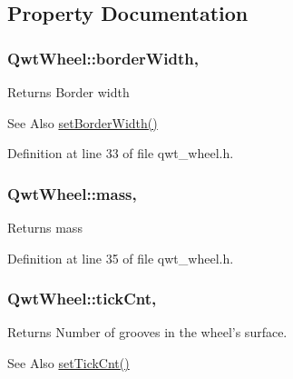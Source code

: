 \subsection{Property Documentation}
\hypertarget{class_qwt_wheel_acc48deaf20aee5957e81bd718bfbc207}{
\subsubsection[{border\-Width}]{ Qwt\-Wheel\-::border\-Width\hspace{0.3cm}{\ttfamily [read]}, {\ttfamily [write]}}}\label{class_qwt_wheel_acc48deaf20aee5957e81bd718bfbc207}
\begin{DoxyReturn}{Returns}
Border width 
\end{DoxyReturn}
\begin{DoxySeeAlso}{See Also}
\hyperlink{class_qwt_wheel_a50a2046f1151af7599aee3ad8f4e3ff0}{set\-Border\-Width()} 
\end{DoxySeeAlso}


Definition at line 33 of file qwt\-\_\-wheel.\-h.

\hypertarget{class_qwt_wheel_abbe2348e811c6448ed33fd8706312e57}{
\subsubsection[{mass}]{ Qwt\-Wheel\-::mass\hspace{0.3cm}{\ttfamily [read]}, {\ttfamily [write]}}}\label{class_qwt_wheel_abbe2348e811c6448ed33fd8706312e57}
\begin{DoxyReturn}{Returns}
mass 
\end{DoxyReturn}


Definition at line 35 of file qwt\-\_\-wheel.\-h.

\hypertarget{class_qwt_wheel_a8206b01fb1fbdd216b640136a780640e}{
\subsubsection[{tick\-Cnt}]{ Qwt\-Wheel\-::tick\-Cnt\hspace{0.3cm}{\ttfamily [read]}, {\ttfamily [write]}}}\label{class_qwt_wheel_a8206b01fb1fbdd216b640136a780640e}
\begin{DoxyReturn}{Returns}
Number of grooves in the wheel's surface. 
\end{DoxyReturn}
\begin{DoxySeeAlso}{See Also}
\hyperlink{class_qwt_wheel_accd38f95f11e33ab2939a39293134c3a}{set\-Tick\-Cnt()} 
\end{DoxySeeAlso}



